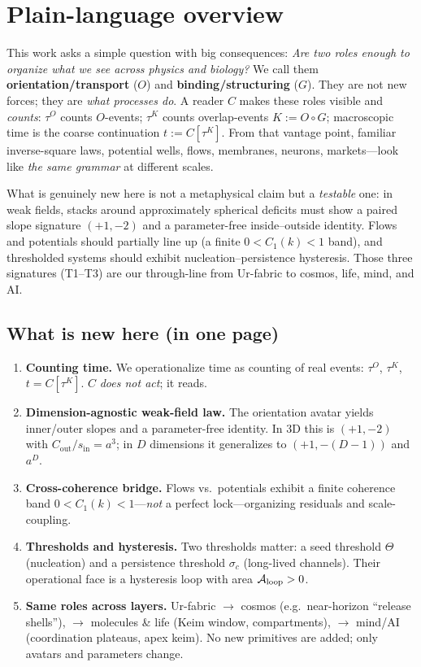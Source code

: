 \documentclass[12pt,a4paper,oneside]{scrreprt}
\begin{document}
\section*{Plain-language overview}
This work asks a simple question with big consequences: \emph{Are two roles enough to organize what we see across physics and biology?} 
We call them \textbf{orientation/transport} ($O$) and \textbf{binding/structuring} ($G$). 
They are not new forces; they are \emph{what processes do}. 
A reader $C$ makes these roles visible and \emph{counts}: $\tau^O$ counts $O$-events; $\tau^K$ counts overlap-events $K:=O\!\circ G$; macroscopic time is the coarse continuation $t:=C[\tau^K]$. 
From that vantage point, familiar inverse-square laws, potential wells, flows, membranes, neurons, markets—look like \emph{the same grammar} at different scales.

What is genuinely new here is not a metaphysical claim but a \emph{testable} one: in weak fields, stacks around approximately spherical deficits must show a paired slope signature $(+1,-2)$ and a parameter-free inside–outside identity. 
Flows and potentials should partially line up (a finite $0<C_1(k)<1$ band), and thresholded systems should exhibit nucleation–persistence hysteresis. 
Those three signatures (T1–T3) are our through-line from Ur-fabric to cosmos, life, mind, and AI.

\subsection*{What is new here (in one page)}
\begin{enumerate}
  \item \textbf{Counting time.} We operationalize time as counting of real events: $\tau^O$, $\tau^K$, $t=C[\tau^K]$. $C$ \emph{does not act}; it reads.
  \item \textbf{Dimension-agnostic weak-field law.} The orientation avatar yields inner/outer slopes and a parameter-free identity. In 3D this is $(+1,-2)$ with $C_{\mathrm{out}}/s_{\mathrm{in}}=a^3$; in $D$ dimensions it generalizes to $(+1,-(D\!-\!1))$ and $a^{D}$.
  \item \textbf{Cross-coherence bridge.} Flows vs.\ potentials exhibit a finite coherence band $0<C_1(k)<1$—\emph{not} a perfect lock—organizing residuals and scale-coupling.
  \item \textbf{Thresholds and hysteresis.} Two thresholds matter: a seed threshold $\Theta$ (nucleation) and a persistence threshold $\sigma_c$ (long-lived channels). Their operational face is a hysteresis loop with area $\mathcal A_{\rm loop}>0$.
  \item \textbf{Same roles across layers.} Ur-fabric $\to$ cosmos (e.g.\ near-horizon “release shells”), $\to$ molecules \& life (Keim window, compartments), $\to$ mind/AI (coordination plateaus, apex keim). No new primitives are added; only avatars and parameters change.
\end{enumerate}
\end{document}
